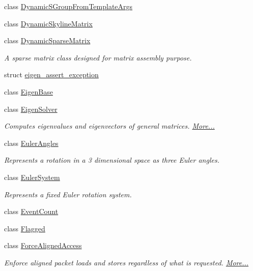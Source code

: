 \begin{DoxyCompactItemize}
class \hyperlink{class_eigen_1_1_dynamic_s_group_from_template_args}{Dynamic\+S\+Group\+From\+Template\+Args}
\item 
class \hyperlink{class_eigen_1_1_dynamic_skyline_matrix}{Dynamic\+Skyline\+Matrix}
\item 
class \hyperlink{class_eigen_1_1_dynamic_sparse_matrix}{Dynamic\+Sparse\+Matrix}
\begin{DoxyCompactList}\small\item\em A sparse matrix class designed for matrix assembly purpose. \end{DoxyCompactList}\item 
struct \hyperlink{struct_eigen_1_1eigen__assert__exception}{eigen\+\_\+assert\+\_\+exception}
\item 
class \hyperlink{group___core___module_struct_eigen_1_1_eigen_base}{Eigen\+Base}
\item 
class \hyperlink{group___eigenvalues___module_class_eigen_1_1_eigen_solver}{Eigen\+Solver}
\begin{DoxyCompactList}\small\item\em Computes eigenvalues and eigenvectors of general matrices.  \hyperlink{group___eigenvalues___module_class_eigen_1_1_eigen_solver}{More...}\end{DoxyCompactList}\item 
class \hyperlink{class_eigen_1_1_euler_angles}{Euler\+Angles}
\begin{DoxyCompactList}\small\item\em Represents a rotation in a 3 dimensional space as three Euler angles. \end{DoxyCompactList}\item 
class \hyperlink{class_eigen_1_1_euler_system}{Euler\+System}
\begin{DoxyCompactList}\small\item\em Represents a fixed Euler rotation system. \end{DoxyCompactList}\item 
class \hyperlink{class_eigen_1_1_event_count}{Event\+Count}
\item 
class \hyperlink{class_eigen_1_1_flagged}{Flagged}
\item 
class \hyperlink{group___core___module_class_eigen_1_1_force_aligned_access}{Force\+Aligned\+Access}
\begin{DoxyCompactList}\small\item\em Enforce aligned packet loads and stores regardless of what is requested.  \hyperlink{group___core___module_class_eigen_1_1_force_aligned_access}{More...}\end{DoxyCompactList}\item 

\end{DoxyCompactItemize}
